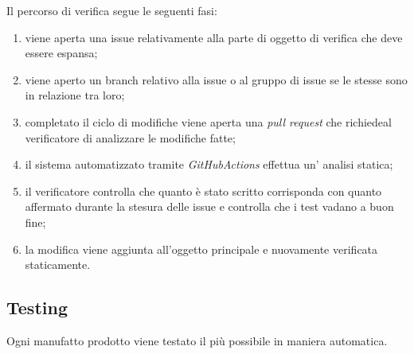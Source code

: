 Il percorso di verifica segue le seguenti fasi:

\begin{enumerate}
    \item viene aperta una issue relativamente alla parte di oggetto di verifica che deve essere espansa;
    \item viene aperto un branch relativo alla issue o al gruppo di issue se le stesse sono in relazione tra loro;
    \item completato il ciclo di modifiche viene aperta una \textit{pull request} che richiedeal verificatore di analizzare le modifiche fatte;
    \item il sistema automatizzato tramite \textit{GitHubActions} effettua un' analisi statica;
    \item il verificatore controlla che quanto è stato scritto corrisponda con quanto affermato durante la stesura delle issue e controlla che i test vadano a buon fine;
    \item la modifica viene aggiunta all'oggetto principale e nuovamente verificata staticamente.
\end{enumerate}

\subsection{Testing}

Ogni manufatto prodotto viene testato il più possibile in maniera automatica.

